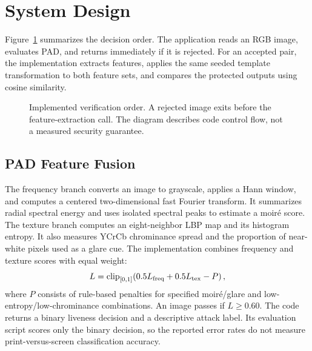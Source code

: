 \documentclass[conference,10pt]{IEEEtran}
\begin{document}
\section{System Design}
Figure~\ref{fig:pipeline} summarizes the decision order. The application reads an RGB image, evaluates PAD, and returns immediately if it is rejected. For an accepted pair, the implementation extracts features, applies the same seeded template transformation to both feature sets, and compares the protected outputs using cosine similarity.

\begin{figure}[t]
\centering
\setlength{\fboxsep}{6pt}
\caption{Implemented verification order. A rejected image exits before the feature-extraction call. The diagram describes code control flow, not a measured security guarantee.}
\label{fig:pipeline}
\end{figure}

\subsection{PAD Feature Fusion}
The frequency branch converts an image to grayscale, applies a Hann window, and computes a centered two-dimensional fast Fourier transform. It summarizes radial spectral energy and uses isolated spectral peaks to estimate a moir\'e score. The texture branch computes an eight-neighbor LBP map and its histogram entropy. It also measures YCrCb chrominance spread and the proportion of near-white pixels used as a glare cue. The implementation combines frequency and texture scores with equal weight:
\begin{equation}
L=\operatorname{clip}_{[0,1]}\!\left(0.5L_{\rm freq}+0.5L_{\rm tex}-P\right),
\label{eq:pad}
\end{equation}
where $P$ consists of rule-based penalties for specified moir\'e/glare and low-entropy/low-chrominance combinations. An image passes if $L\geq 0.60$. The code returns a binary liveness decision and a descriptive attack label. Its evaluation script scores only the binary decision, so the reported error rates do not measure print-versus-screen classification accuracy.
\end{document}
